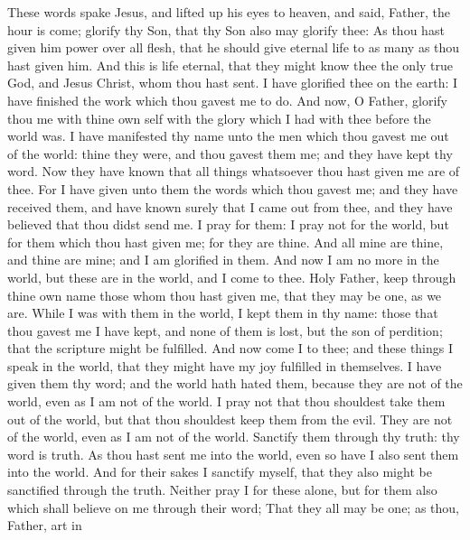  These words spake Jesus, and lifted up his eyes to heaven,
and said, Father, the hour is come; glorify thy Son, that thy Son also
may glorify thee:  As thou hast given him power over all
flesh, that he should give eternal life to as many as thou hast given
him.  And this is life eternal, that they might know thee
the only true God, and Jesus Christ, whom thou hast sent.  I
have glorified thee on the earth: I have finished the work which thou
gavest me to do.  And now, O Father, glorify thou me with
thine own self with the glory which I had with thee before the world
was.  I have manifested thy name unto the men which thou
gavest me out of the world: thine they were, and thou gavest them me;
and they have kept thy word.  Now they have known that all
things whatsoever thou hast given me are of thee.  For I
have given unto them the words which thou gavest me; and they have
received them, and have known surely that I came out from thee, and they
have believed that thou didst send me.  I pray for them: I
pray not for the world, but for them which thou hast given me; for they
are thine.  And all mine are thine, and thine are mine; and
I am glorified in them.  And now I am no more in the world,
but these are in the world, and I come to thee. Holy Father, keep
through thine own name those whom thou hast given me, that they may be
one, as we are.  While I was with them in the world, I kept
them in thy name: those that thou gavest me I have kept, and none of
them is lost, but the son of perdition; that the scripture might be
fulfilled.  And now come I to thee; and these things I
speak in the world, that they might have my joy fulfilled in themselves.
 I have given them thy word; and the world hath hated them,
because they are not of the world, even as I am not of the world.
 I pray not that thou shouldest take them out of the world,
but that thou shouldest keep them from the evil.  They are
not of the world, even as I am not of the world.  Sanctify
them through thy truth: thy word is truth.  As thou hast
sent me into the world, even so have I also sent them into the world.
 And for their sakes I sanctify myself, that they also
might be sanctified through the truth.  Neither pray I for
these alone, but for them also which shall believe on me through their
word;  That they all may be one; as thou, Father, art in
